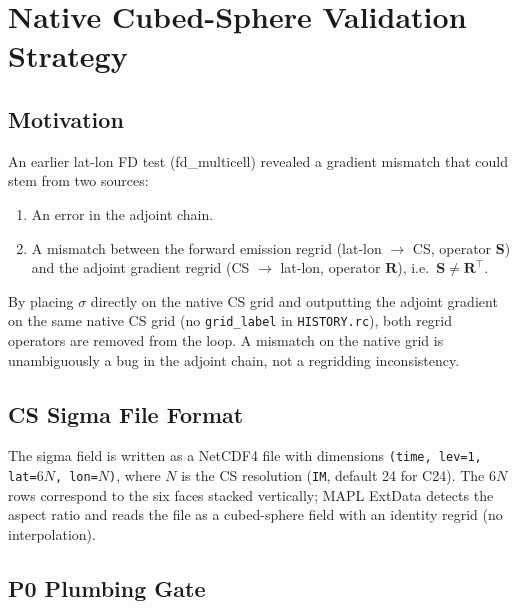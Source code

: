 \documentclass[12pt]{article}
\begin{document}
\section{Native Cubed-Sphere Validation Strategy}

\subsection{Motivation}

An earlier lat-lon FD test (fd\_multicell) revealed a gradient mismatch that
could stem from two sources:
\begin{enumerate}[label=(\roman*)]
  \item An error in the adjoint chain.
  \item A mismatch between the forward emission regrid (lat-lon $\to$ CS,
        operator $\mathbf{S}$) and the adjoint gradient regrid (CS $\to$
        lat-lon, operator $\mathbf{R}$), i.e.\ $\mathbf{S} \neq \mathbf{R}^\top$.
\end{enumerate}
By placing $\sigma$ directly on the native CS grid and outputting the adjoint
gradient on the same native CS grid (no \texttt{grid\_label} in \texttt{HISTORY.rc}),
both regrid operators are removed from the loop.  A mismatch on the native
grid is unambiguously a bug in the adjoint chain, not a regridding inconsistency.

\subsection{CS Sigma File Format}

The sigma field is written as a NetCDF4 file with dimensions
\texttt{(time, lev=1, lat=$6N$, lon=$N$)}, where $N$ is the CS resolution
(\texttt{IM}, default 24 for C24).  The $6N$ rows correspond to the six faces
stacked vertically; MAPL ExtData detects the aspect ratio and reads the file
as a cubed-sphere field with an identity regrid (no interpolation).

\subsection{P0 Plumbing Gate}
\end{document}
